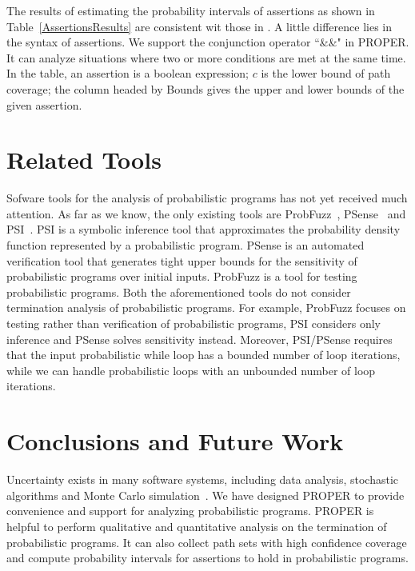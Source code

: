 \documentclass[sigconf,review, anonymous]{acmart}
\begin{document}
The results of estimating the probability intervals of assertions as shown in Table~\ref{AssertionsResults} are consistent wit those in \cite{Sankaranarayanan2013Static}. A little difference lies in the syntax of assertions. We support the conjunction operator  ``\&\&" in PROPER. It can analyze situations where two or more conditions are met at the same time. In the table, an assertion is a boolean expression; $c$ is the lower bound of path coverage; the column headed by Bounds gives the upper and lower bounds of the given assertion.%

\section{Related Tools}
Sofware tools for the analysis of probabilistic programs has not yet received much attention. 
As far as we know, the only existing tools are ProbFuzz~\cite{DBLP:conf/sigsoft/DuttaLHM18}, PSense~\cite{DBLP:conf/atva/HuangWM18} and PSI~\cite{DBLP:conf/cav/GehrMV16}.
PSI is a symbolic inference tool that approximates the probability density function represented by a probabilistic program. 
PSense is an automated verification tool that generates tight upper bounds for the sensitivity of probabilistic programs over initial inputs.
ProbFuzz is a tool for testing probabilistic programs. 
Both the aforementioned tools do not consider termination analysis of probabilistic programs. 
For example, ProbFuzz focuses on testing rather than verification of probabilistic programs, 
PSI considers only inference and PSense solves sensitivity instead. 
Moreover, PSI/PSense requires that the input probabilistic while loop has a bounded number of loop iterations, while we can handle probabilistic loops with an unbounded number of loop iterations.

\section{Conclusions and Future Work}
Uncertainty exists in many software systems, including data analysis, stochastic algorithms and Monte Carlo simulation~\cite{HASTINGS1970Monte}. We have designed PROPER  to provide convenience and support for analyzing probabilistic programs.
PROPER is helpful to perform qualitative and quantitative analysis on the termination of probabilistic programs. It can also collect path sets with high confidence coverage and compute  probability intervals for assertions to hold in probabilistic programs.
\end{document}
